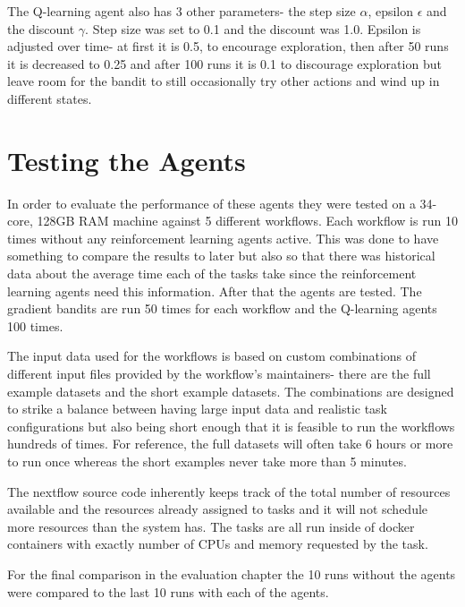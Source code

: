 The Q-learning agent also has 3 other parameters- the step size $\alpha$, epsilon $\epsilon$ and the discount $\gamma$. Step size was set to 0.1 and the discount was 1.0. Epsilon is adjusted over time- at first it is 0.5, to encourage exploration, then after 50 runs it is decreased to 0.25 and after 100 runs it is 0.1 to discourage exploration but leave room for the bandit to still occasionally try other actions and wind up in different states.

\section{Testing the Agents}
\label{sec:testing}

In order to evaluate the performance of these agents they were tested on a 34-core, 128GB RAM machine against 5 different workflows. Each workflow is run 10 times without any reinforcement learning agents active. This was done to have something to compare the results to later but also so that there was historical data about the average time each of the tasks take since the reinforcement learning agents need this information. After that the agents are tested. The gradient bandits are run 50 times for each workflow and the Q-learning agents 100 times.

The input data used for the workflows is based on custom combinations of different input files provided by the workflow's maintainers- there are the full example datasets and the short example datasets. The combinations are designed to strike a balance between having large input data and realistic task configurations but also being short enough that it is feasible to run the workflows hundreds of times. For reference, the full datasets will often take 6 hours or more to run once whereas the short examples never take more than 5 minutes. 

The nextflow source code inherently keeps track of the total number of resources available and the resources already assigned to tasks and it will not schedule more resources than the system has. The tasks are all run inside of docker containers with exactly number of CPUs and memory requested by the task. 

For the final comparison in the evaluation chapter the 10 runs without the agents were compared to the last 10 runs with each of the agents.


